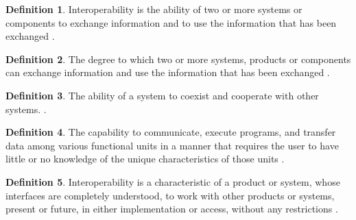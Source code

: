 \documentclass[letterpaper,cleveref]{lipics-v2019}
\theoremstyle{definition}
\newtheorem{defn}{Definition}
\begin{document}
\begin{defn}
Interoperability is the ability of two or more systems or components to exchange
information and to use the information that has been exchanged
\citep{IEEEComputerDictionary1991}.
\end{defn}
\begin{defn}
\label{InteroperabilitySelected}
The degree to which two or more systems, products or components can exchange
information and use the information that has been exchanged
\citep{ISO/IEC25010}.
\end{defn}
\begin{defn}
The ability of a system to coexist and cooperate with other systems.
\citep{ghezzi1991fundamentals}.
\end{defn}
\begin{defn}
The capability to communicate, execute programs, and transfer data among various
functional units in a manner that requires the user to have little or no
knowledge of the unique characteristics of those units
\citep{ISO/IEC/IEEE24765}.
\end{defn}
\begin{defn}Interoperability is a characteristic of a product or system, whose
interfaces are completely understood, to work with other products or systems,
present or future, in either implementation or access, without any restrictions
\citep{AFUL2019}.
\end{defn}
\end{document}
